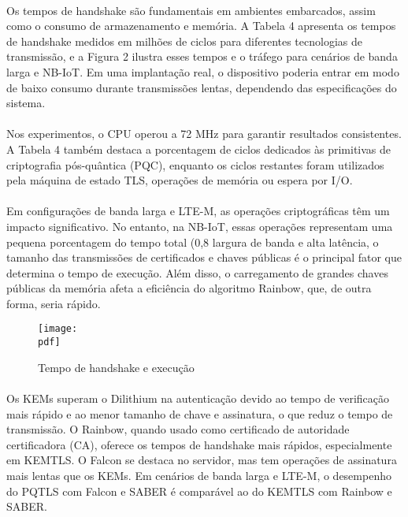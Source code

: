 \documentclass[letterpaper,11pt,leqno]{article}
\newcommand{\pdf}{figures/figures}
\begin{document}
\paragraph{}
Os tempos de handshake são fundamentais em ambientes embarcados, assim como o
consumo de armazenamento e memória. A Tabela 4 apresenta os tempos de handshake
medidos em milhões de ciclos para diferentes tecnologias de transmissão, e a
Figura 2 ilustra esses tempos e o tráfego para cenários de banda larga e NB-IoT.
Em uma implantação real, o dispositivo poderia entrar em modo de baixo consumo
durante transmissões lentas, dependendo das especificações do sistema.

\paragraph{}
Nos experimentos, o CPU operou a 72 MHz para garantir resultados consistentes. A
Tabela 4 também destaca a porcentagem de ciclos dedicados às primitivas de
criptografia pós-quântica (PQC), enquanto os ciclos restantes foram utilizados
pela máquina de estado TLS, operações de memória ou espera por I/O.

\paragraph{}
Em configurações de banda larga e LTE-M, as operações criptográficas têm um
impacto significativo. No entanto, na NB-IoT, essas operações representam uma
pequena porcentagem do tempo total (0,8%
largura de banda e alta latência, o tamanho das transmissões de certificados e
chaves públicas é o principal fator que determina o tempo de execução. Além
disso, o carregamento de grandes chaves públicas da memória afeta a eficiência
do algoritmo Rainbow, que, de outra forma, seria rápido.

\begin{figure}[H]
	{\texttt{[image: \\pdf]}}
	\caption{Tempo de handshake e execução}
	\label{f:table4}\end{figure}

\paragraph{}
Os KEMs superam o Dilithium na autenticação devido ao tempo de verificação mais
rápido e ao menor tamanho de chave e assinatura, o que reduz o tempo de
transmissão. O Rainbow, quando usado como certificado de autoridade
certificadora (CA), oferece os tempos de handshake mais rápidos, especialmente
em KEMTLS. O Falcon se destaca no servidor, mas tem operações de assinatura mais
lentas que os KEMs. Em cenários de banda larga e LTE-M, o desempenho do PQTLS
com Falcon e SABER é comparável ao do KEMTLS com Rainbow e SABER.
\end{document}
